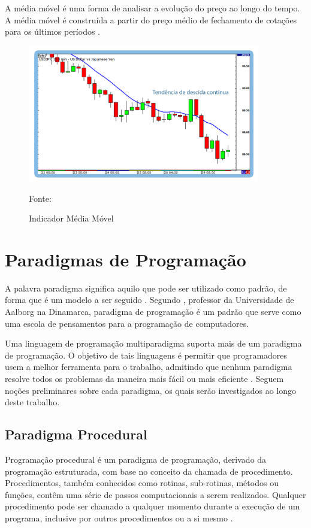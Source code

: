 A média móvel é uma forma de analisar a evolução do preço ao longo do tempo. A média móvel é construída a partir do preço médio de fechamento de cotações para os últimos períodos \cite{investforex}.

\begin{figure}[H]
\centering
\includegraphics[width=0.9\textwidth]{figuras/mediamovel}
\caption{Indicador Média Móvel}{Fonte: } 
\label{mediamovel}
\end{figure}

\section{Paradigmas de Programação}

A palavra paradigma significa aquilo que pode ser utilizado como padrão, de forma que é um modelo a ser seguido \cite{ferreira1986}. Segundo , professor da Universidade de Aalborg na Dinamarca, paradigma de programação é um padrão que serve como uma escola de pensamentos para a programação de computadores.

Uma linguagem de programação multiparadigma suporta mais de um paradigma de programação. O objetivo de tais linguagens é permitir que programadores usem a melhor ferramenta para o trabalho, admitindo que nenhum paradigma  resolve todos os problemas da maneira mais fácil ou mais eficiente \cite[pág.~21]{paquet2010}. Seguem noções preliminares sobre cada paradigma, os quais serão investigados ao longo deste trabalho.

\subsection{Paradigma Procedural}

Programação procedural é um paradigma de programação, derivado da programação estruturada, com base no conceito da chamada de procedimento. Procedimentos, também conhecidos como rotinas, sub-rotinas, métodos ou funções, contêm uma série de passos computacionais a serem realizados. Qualquer procedimento pode ser chamado a qualquer momento durante a execução de um programa, inclusive por outros procedimentos ou a si mesmo \cite[pág.~22]{paquet2010}.

